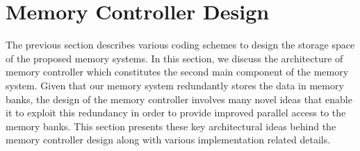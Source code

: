 \section{Memory Controller Design}
\label{sec:memcontrol}
The previous section describes various coding schemes to design the storage space of the proposed memory systems. In this section, we discuss the architecture of memory controller which constitutes the second main component of the memory system. Given that our memory system redundantly stores the data in memory banks, the design of the memory controller involves many novel ideas that enable it to exploit this redundancy in order to provide improved parallel access to the memory banks. This section presents these key architectural ideas behind the memory controller design along with various implementation related details.

